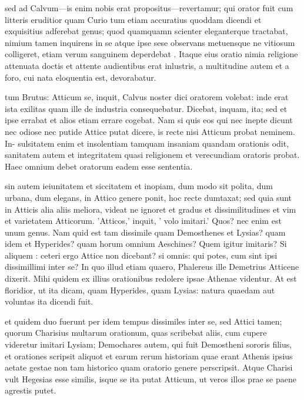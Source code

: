  sed ad Calvum—is enim nobis erat propositus—revertamur; qui orator fuit cum litteris eruditior quam Curio tum etiam accuratius quoddam dicendi et exquisitius adferebat genus; quod quamquamn scienter eleganterque tractabat, nimium tamen inquirens in se atque ipse sese observans metuensque ne vitiosum colligeret, etiam verum sanguinem deperdebat . Itaque eius oratio nimia religione attenuata doctis et attente audientibus erat inlustris, a multitudine autem et a foro, cui nata eloquentia est, devorabatur.

 tum Brutus: Atticum se, inquit, Calvus noster dici oratorem volebat: inde erat ista exilitas quam ille de industria consequebatur. Dicebat, inquam, ita; sed et ipse errabat et alios etiam errare cogebat. Nam si quis eos qui nec inepte dicunt nec odiose nec putide Attice putat dicere, is recte nisi Atticum probat neminem. In- sulsitatem enim et insolentiam tamquam insaniam quandam orationis odit, sanitatem autem et integritatem quasi religionem et verecundiam oratoris probat. Haec omnium debet oratorum eadem esse sententia.

 sin autem ieiunitatem et siccitatem et inopiam, dum modo sit polita, dum urbana, dum elegans, in Attico genere ponit, hoc recte dumtaxat; sed quia sunt in Atticis alia aliis meliora, videat ne ignoret et gradus et dissimilitudines et vim et varietatem Atticorum. 'Atticos,' inquit, ' volo imitari.' Quos? nec enim est unum genus. Nam quid est tam dissimile quam Demosthenes et Lysias? quam idem et Hyperides? quam horum omnium Aeschines? Quem igitur imitaris? Si aliquem : ceteri ergo Attice non dicebant? si omnis: qui potes, cum sint ipsi dissimillimi inter se? In quo illud etiam quaero, Phalereus ille Demetrius Atticene dixerit. Mihi quidem ex illius orationibus redolere ipsae Athenae videntur. At est floridior, ut ita dicam, quam Hyperides, quam Lysias: natura quaedam aut voluntas ita dicendi fuit.

 et quidem duo fuerunt per idem tempus dissimiles inter se, sed Attici tamen; quorum Charisius multarum orationum, quas scribebat aliis, cum cupere videretur imitari Lysiam; Demochares autem, qui fuit Demostheni sororis filius, et orationes scripsit aliquot et earum rerum historiam quae erant Athenis ipsius aetate gestae non tam historico quam oratorio genere perscripsit. Atque Charisi vult Hegesias esse similis, isque se ita putat Atticum, ut veros illos prae se paene agrestis putet.

